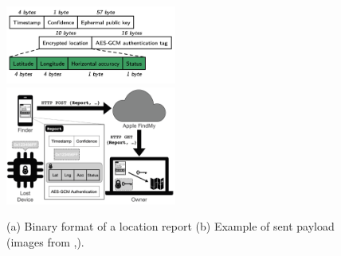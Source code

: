 \documentclass[english]{article}
\begin{document}
\begin{figure}
	\centering
	\includegraphics[width=0.5\textwidth]{images/packet.png}\hfill 
	\includegraphics[width=0.5\textwidth]{images/findmysec.png}
	\caption{(a) Binary format of a location report \quad (b) Example of sent payload (images from \cite{whocanfind},\cite{airguard}).}
	\label{comparison}
\end{figure}
\end{document}
